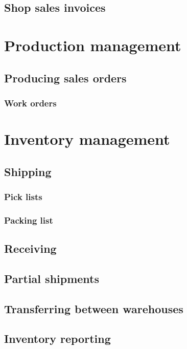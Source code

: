 \section{Shop sales invoices}

\chapter{Production management}

\section{Producing sales orders}

\subsection{Work orders}


\chapter{Inventory management}

\section{Shipping}

\subsection{Pick lists}
\subsection{Packing list}

\section{Receiving}

\section{Partial shipments}

\section{Transferring between warehouses}

\section{Inventory reporting}



